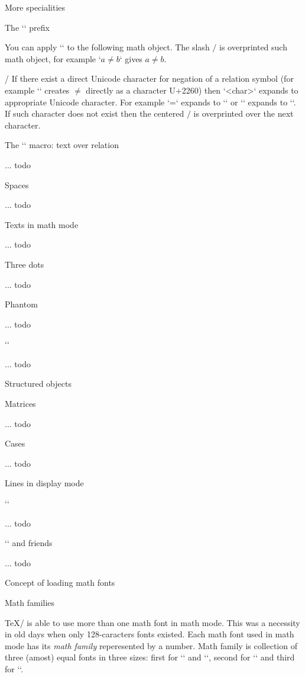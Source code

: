 \sec More specialities

\secc The `\not` prefix

You can apply `\not` to the following math object.
The slash $/$ is overprinted such math object, for example 
`$a \not= b$` gives $a \not= b$.

\new \OpTeX/
If there exist a direct Unicode character for negation of a relation symbol
(for example `\ne` creates $\ne$ directly as a character U+2260) 
then `\not<char>` expands to appropriate Unicode character. 
For example `\not=` expands to `\ne` or `\not\in` expands to `\notin`.
If such character does not exist then
the centered $/$ is overprinted over the next character. 




\secc The `\bulidrel` macro: text over relation

... todo

\secc Spaces

... todo

\secc Texts in math mode

... todo

\secc Three dots

... todo

\secc Phantom

... todo

\secc `\vcenter`

... todo

\sec Structured objects

\secc Matrices

... todo

\secc Cases

... todo

\sec Lines in display mode

\secc `\displaylines`

... todo

\secc `\eqalign` and friends

... todo

\sec Concept of loading math fonts

\secc[fams] Math families

\TeX/ is able to use more than one math font in math mode. This was a
necessity in old days when only 128-caracters fonts existed.
Each math font used in math mode has its {\em math family} reperesented by a number.
Math family is collection of three (amost) equal fonts in three sizes:
first for `\textstyle` and `\displaystyle`, second for `\scriptstyle`
and third for `\scriptscriptstyle`.

